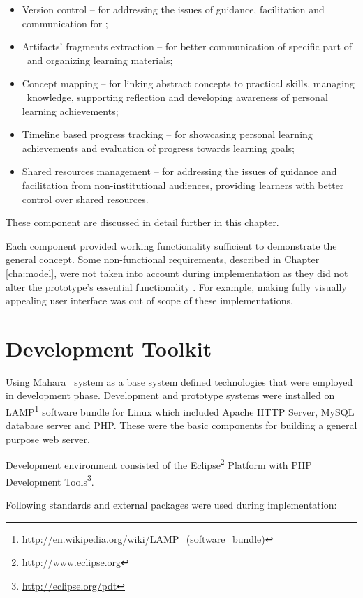 \begin{itemize}
  \item Version control -- for addressing the issues of guidance, facilitation
  and communication for \LLLsn;
  \item Artifacts' fragments extraction -- for better communication of specific
  part of \ep~and organizing learning materials;
  \item Concept mapping -- for linking abstract concepts to practical skills,
  managing \ep~knowledge, supporting reflection and developing awareness of
  personal learning achievements;
  \item Timeline based progress tracking -- for showcasing personal learning
  achievements and evaluation of progress towards learning goals;
  \item Shared resources management -- for addressing the issues of guidance
  and facilitation from non-institutional audiences, providing learners with
  better control over shared resources.
\end{itemize}

These component are discussed in detail further in this chapter.

Each component provided working functionality sufficient to demonstrate the
general concept. Some non-functional requirements, described in Chapter
\ref{cha:model}, were not taken into account during implementation as they did
not alter the prototype's essential functionality \citep{Robertson2006}. For
example, making fully visually appealing user interface was out of scope of these
implementations.

\section{Development Toolkit}

Using Mahara \ep~system as a base system defined technologies that were employed
in development phase. Development and prototype systems were installed on
LAMP\footnote{\url{http://en.wikipedia.org/wiki/LAMP_(software_bundle)}}
software bundle for Linux which included Apache HTTP Server, MySQL database
server and PHP. These were the basic components for building a general purpose
web server.

Development environment consisted of the
Eclipse\footnote{\url{http://www.eclipse.org}} Platform with PHP Development
Tools\footnote{\url{http://eclipse.org/pdt}}.

Following standards and external packages were used during implementation:

